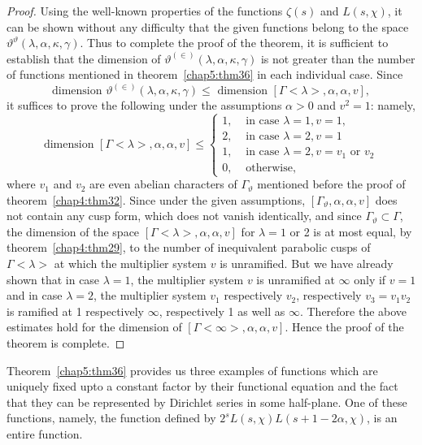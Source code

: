 \begin{proof}
Using the well-known properties of the functions $\zeta(s)$ and\break
$L(s,\chi)$, it can be shown without any difficulty that the given
functions belong to the space $\vartheta^{\vartheta}(\lambda, \alpha,
\kappa, \gamma)$. Thus to complete the proof of the theorem, it is
sufficient to establish that the dimension of
$\vartheta^{(\in)}(\lambda, \alpha, \kappa, \gamma)$ is not
greater than the number of functions mentioned in 
theorem~\ref{chap5:thm36} in each individual case. Since 
$$
\text{dimension } \vartheta^{(\in)}(\lambda, \alpha,\kappa,
\gamma) \leq \text{ dimension } [\Gamma<\lambda>,\alpha,\alpha, v],
$$\pageoriginale 
it suffices to prove the following under the assumptions $\alpha >0$
and $v^2=1$: namely,
$$
\text{dimension } [\Gamma<\lambda>, \alpha, \alpha,v] \leq 
\begin{cases}
1, & \text{ in case } \lambda =1, v=1,\\
2, & \text{ in case } \lambda =2, v=1\\
1, & \text{ in case } \lambda =2, v=v_1 \text{ or } v_2\\
0, & \text{ otherwise},
\end{cases}
$$
where $v_1$ and $v_2$ are even abelian characters of
$\Gamma_{\vartheta}$ mentioned before the proof of theorem~\ref{chap4:thm32}. Since
under the given assumptions, $[\Gamma_{\vartheta}, \alpha, \alpha, v]$
does not contain any cusp form, which does not vanish identically, and
since $\Gamma_{\vartheta} \subset \Gamma$, the dimension of the space
$[\Gamma<\lambda>,\alpha, \alpha, v]$ for $\lambda=1$ or 2 is at most
equal, by theorem~\ref{chap4:thm29}, to the number of inequivalent parabolic cusps of
$\Gamma<\lambda>$ at which the multiplier system $v$ is
unramified. But we have already shown that in case $\lambda=1$, the
multiplier system $v$ is unramified at $\infty$ only if $v=1$ and in
case $\lambda=2$, the multiplier system $v_1$ respectively $v_2$,
respectively $v_3=v_1v_2$ is ramified at 1 respectively $\infty$,
respectively 1 as well as $\infty$. Therefore the above estimates hold
for the dimension of $[\Gamma<\infty>, \alpha,\alpha,v]$. Hence the
proof of the theorem is complete.
\end{proof}

Theorem~\ref{chap5:thm36} provides us three examples of functions which 
are uni\-que\-ly fixed upto a constant factor by their functional 
equation and the fact that they can be represented by Dirichlet series in some
half-plane. One of these functions, namely, the function defined by
$2^sL(s,\chi) L(s+1-2\alpha,\chi)$, is an entire function.

